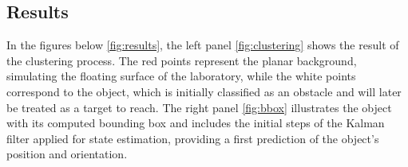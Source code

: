 \subsection{Results}

In the figures below \ref{fig:results}, the left panel \ref{fig:clustering} shows the result of the clustering process. The red points represent the planar background, 
simulating the floating surface of the laboratory, while the white points correspond to the object, which is initially classified 
as an obstacle and will later be treated as a target to reach. 
The right panel \ref{fig:bbox} illustrates the object with its computed bounding box and includes the initial steps of the Kalman filter 
applied for state estimation, providing a first prediction of the object's position and orientation.


